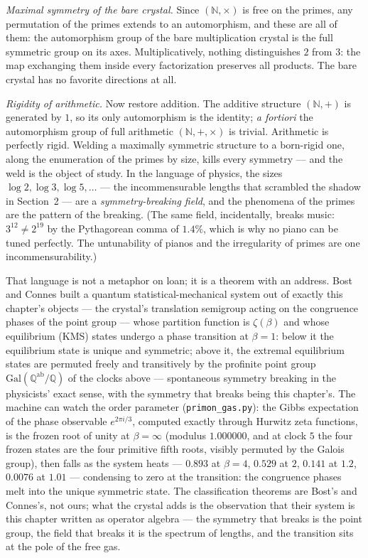 \documentclass[11pt]{article}
\theoremstyle{remark}
\begin{document}
\emph{Maximal symmetry of the bare crystal.} Since $(\mathbb{N}, \times)$ is free on the primes, any
permutation of the primes extends to an automorphism, and these are all of them: the automorphism
group of the bare multiplication crystal is the full symmetric group on its axes. Multiplicatively,
nothing distinguishes $2$ from $3$: the map exchanging them inside every factorization preserves all
products. The bare crystal has no favorite directions at all.

\emph{Rigidity of arithmetic.} Now restore addition. The additive structure $(\mathbb{N}, +)$ is
generated by $1$, so its only automorphism is the identity; \emph{a fortiori} the automorphism group
of full arithmetic $(\mathbb{N}, +, \times)$ is trivial. Arithmetic is perfectly rigid. Welding a
maximally symmetric structure to a born-rigid one, along the enumeration of the primes by size, kills
every symmetry --- and the weld is the object of study. In the language of physics, the sizes
$\log 2, \log 3, \log 5, \ldots$ --- the incommensurable lengths that scrambled the shadow in
Section~2 --- are a \emph{symmetry-breaking field}, and the phenomena of the primes are the pattern
of the breaking. (The same field, incidentally, breaks music: $3^{12} \ne 2^{19}$ by the Pythagorean
comma of $1.4\%$, which is why no piano can be tuned perfectly. The untunability of pianos and the
irregularity of primes are one incommensurability.)

That language is not a metaphor on loan; it is a theorem with an address. Bost and Connes
\cite{BostConnes} built a quantum statistical-mechanical system out of exactly this chapter's
objects --- the crystal's translation semigroup acting on the congruence phases of the point
group --- whose partition function is $\zeta(\beta)$ and whose equilibrium (KMS) states undergo a
phase transition at $\beta = 1$: below it the equilibrium state is unique and symmetric; above
it, the extremal equilibrium states are permuted freely and transitively by the profinite point
group $\mathrm{Gal}(\mathbb{Q}^{\mathrm{ab}}/\mathbb{Q})$ of the clocks above --- spontaneous
symmetry breaking in the physicists' exact sense, with the symmetry that breaks being this
chapter's. The machine can watch the order parameter (\texttt{primon\_gas.py}): the Gibbs
expectation of the phase observable $e^{2\pi i/3}$, computed exactly through Hurwitz zeta
functions, is the frozen root of unity at $\beta = \infty$ (modulus $1.000000$, and at clock $5$
the four frozen states are the four primitive fifth roots, visibly permuted by the Galois group),
then falls as the system heats --- $0.893$ at $\beta = 4$, $0.529$ at $2$, $0.141$ at $1.2$,
$0.0076$ at $1.01$ --- condensing to zero at the transition: the congruence phases melt into the
unique symmetric state. The classification theorems are Bost's and Connes's, not ours; what the
crystal adds is the observation that their system is this chapter written as operator algebra ---
the symmetry that breaks is the point group, the field that breaks it is the spectrum of lengths,
and the transition sits at the pole of the free gas.
\end{document}
